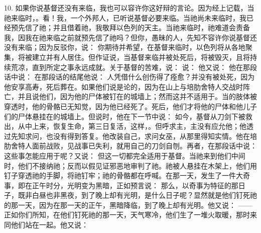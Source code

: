 10. 如果你说基督还没有来临，我也可以容许你这好辩的言论。因为经上记载，当祂来临时，。看！我，一个外邦人，已听说基督必要来临。当祂尚未来临时，我已经预先信了祂；并且借着祂，我敬拜以色列的天主。当祂来临时，祂难道会责备我，因我在祂来临之前就预先信了祂吗？但你，愚昧的人，先知不容许你说基督还没有来临；因为反驳你，说： 你期待并希望，在基督来临时，以色列将从各地聚集，将被建立并有人居住。但作证说，当基督来临并被处死后，将被毁灭，且将持续荒凉，直到所定之事永远成就。关于基督的苦难，说： 说： 他又说： 他在那段话中说： 在那段话的结尾他说： 人凭借什么创伤得了痊愈？并没有被处死，因为他安享高寿，死后葬在。如果他们说是论的，因为在山上与培肋舍特人交战时阵亡，并且说他们，因为他的尸体被钉在的城墙上；然而这并不适用于。当的肢体被穿透时，他的骨骼已无知觉，因为他已经死了。死后，他们才将他的尸体和他儿子们的尸体悬挂在的城墙上。但说时，他在下一节中说： 如今，基督从刀剑下被救出，从中上来，恢复生命，第三日复活，这样，。但呼求主，主没有应允他；他透过先知求问，也没有得到答复。他改装自己，求问女巫，从那里得知实情。他在培肋舍特人面前战败，见战事已失利，就用自己的刀剑自刎。再者，在那段话中说： 这些事怎能应用于呢？又说： 但这一切都完全适用于基督。当祂来到他们中间时，他们不接纳祂；反而以假见证邪恶地审判了祂。祂被人悬挂在木架上，他们用钉子穿透祂的手脚，将祂钉牢；祂的骨骼都在呼喊。在那一天，发生了一件大奇事，即在正午时分，光明变为黑暗，正如预言说： 那么，以奇事为特征的那日子，既非白昼也非黑夜，到了晚上却有光明，是什么日子呢？显然就是他们钉死祂的那一天，因为在那一天的正午，黑暗降临，到了晚上却有光明。他又说： ——正如你们所知，在他们钉死祂的那一天，天气寒冷，他们生了一堆火取暖，那时来同他们站在一起。他又说： 